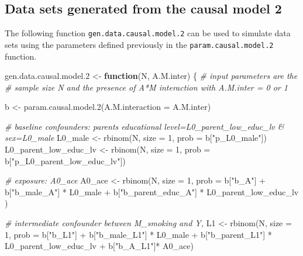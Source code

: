\documentclass[
]{book}
\newenvironment{Shaded}{\begin{snugshade}}{\end{snugshade}}
\newcommand{\AttributeTok}[1]{\textcolor[rgb]{0.77,0.63,0.00}{#1}}
\newcommand{\CommentTok}[1]{\textcolor[rgb]{0.56,0.35,0.01}{\textit{#1}}}
\newcommand{\ControlFlowTok}[1]{\textcolor[rgb]{0.13,0.29,0.53}{\textbf{#1}}}
\newcommand{\DecValTok}[1]{\textcolor[rgb]{0.00,0.00,0.81}{#1}}
\newcommand{\FloatTok}[1]{\textcolor[rgb]{0.00,0.00,0.81}{#1}}
\newcommand{\FunctionTok}[1]{\textcolor[rgb]{0.00,0.00,0.00}{#1}}
\newcommand{\NormalTok}[1]{#1}
\newcommand{\OtherTok}[1]{\textcolor[rgb]{0.56,0.35,0.01}{#1}}
\newcommand{\SpecialCharTok}[1]{\textcolor[rgb]{0.00,0.00,0.00}{#1}}
\newcommand{\StringTok}[1]{\textcolor[rgb]{0.31,0.60,0.02}{#1}}
\begin{document}
\hypertarget{data-sets-generated-from-the-causal-model-2}{%
\subsection{Data sets generated from the causal model 2}\label{data-sets-generated-from-the-causal-model-2}}

The following function \texttt{gen.data.causal.model.2} can be used to simulate data sets using the parameters defined previously in the \texttt{param.causal.model.2} function.

\begin{Shaded}
\begin{Highlighting}[]
\NormalTok{gen.data.causal.model}\FloatTok{.2} \OtherTok{\textless{}{-}} \ControlFlowTok{function}\NormalTok{(N, A.M.inter) \{ }\CommentTok{\# input parameters are the }
  \CommentTok{\#   sample size N and the presence of A*M interaction with A.M.inter = 0 or 1}
  
\NormalTok{  b }\OtherTok{\textless{}{-}} \FunctionTok{param.causal.model.2}\NormalTok{(}\AttributeTok{A.M.interaction =}\NormalTok{ A.M.inter)}
    
  \CommentTok{\# baseline confounders: parent\textquotesingle{}s educational level=L0\_parent\_low\_educ\_lv \& sex=L0\_male}
\NormalTok{  L0\_male }\OtherTok{\textless{}{-}} \FunctionTok{rbinom}\NormalTok{(N, }\AttributeTok{size =} \DecValTok{1}\NormalTok{, }\AttributeTok{prob =}\NormalTok{ b[}\StringTok{"p\_L0\_male"}\NormalTok{]) }
\NormalTok{  L0\_parent\_low\_educ\_lv }\OtherTok{\textless{}{-}} \FunctionTok{rbinom}\NormalTok{(N, }\AttributeTok{size =} \DecValTok{1}\NormalTok{, }\AttributeTok{prob =}\NormalTok{ b[}\StringTok{"p\_L0\_parent\_low\_educ\_lv"}\NormalTok{])  }
  
  \CommentTok{\# exposure: A0\_ace}
\NormalTok{  A0\_ace }\OtherTok{\textless{}{-}} \FunctionTok{rbinom}\NormalTok{(N, }\AttributeTok{size =} \DecValTok{1}\NormalTok{, }\AttributeTok{prob =}\NormalTok{  b[}\StringTok{"b\_A"}\NormalTok{] }\SpecialCharTok{+} 
\NormalTok{                     b[}\StringTok{"b\_male\_A"}\NormalTok{] }\SpecialCharTok{*}\NormalTok{ L0\_male }\SpecialCharTok{+} 
\NormalTok{                     b[}\StringTok{"b\_parent\_educ\_A"}\NormalTok{] }\SpecialCharTok{*}\NormalTok{ L0\_parent\_low\_educ\_lv ) }
  
  \CommentTok{\# intermediate confounder between M\_smoking and Y, }
\NormalTok{  L1 }\OtherTok{\textless{}{-}} \FunctionTok{rbinom}\NormalTok{(N, }\AttributeTok{size =} \DecValTok{1}\NormalTok{, }\AttributeTok{prob =}\NormalTok{ b[}\StringTok{"b\_L1"}\NormalTok{] }\SpecialCharTok{+}
\NormalTok{                 b[}\StringTok{"b\_male\_L1"}\NormalTok{] }\SpecialCharTok{*}\NormalTok{ L0\_male }\SpecialCharTok{+}
\NormalTok{                 b[}\StringTok{"b\_parent\_L1"}\NormalTok{] }\SpecialCharTok{*}\NormalTok{ L0\_parent\_low\_educ\_lv }\SpecialCharTok{+} 
\NormalTok{                 b[}\StringTok{"b\_A\_L1"}\NormalTok{]}\SpecialCharTok{*}\NormalTok{ A0\_ace)}
  

\end{Highlighting}
\end{Shaded}
\end{document}

